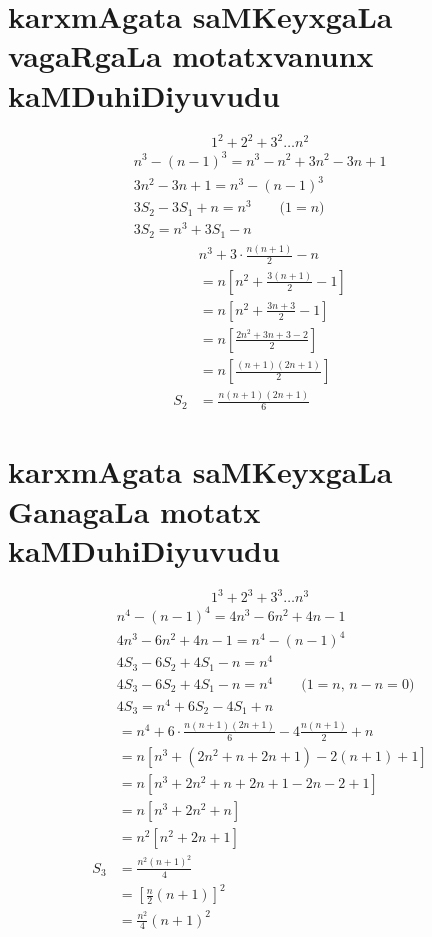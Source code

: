 \section*{\;karxmAgata saMKeyxgaLa vagaRgaLa motatxvanunx kaMDuhiDiyuvudu}
$$
1^2+2^2+3^2\ldots n^2
$$
\begin{gather*}
n^3 -(n-1)^3 = n^3 - n^2+3n^2 - 3n+1\\
3n^2-3n+1 = n^3-(n-1)^3\\
3S_{2}-3S_{1} +n = n^3 \qquad\text{($1=n$)}\\
3S_{2} = n^3+ 3S_{1}-n
\end{gather*}
\begin{align*}
&n^3 + 3 \cdot \frac{n(n+1)}{2} -n\\
&=n\left[n^2+\frac {3(n+1)}{2}-1\right]\\
&=n \left[n^2+\frac{3n+3}{2}-1\right]\\
&=n\left[\frac{2n^2 + 3n + 3 - 2}{2}\right]\\
&=n\left[\frac{(n+1)(2n+1)}{2}\right]\\
S_2 &=\frac{n(n+1)(2n+1)}{6}
\end{align*}

\section*{\;karxmAgata saMKeyxgaLa GanagaLa motatx kaMDuhiDiyuvudu}
$$
1^3+2^3+3^3\ldots n^3
$$
\begin{align*}
&n^4 - (n-1)^4 = 4n^3 - 6n^2 +4n -1\\
&4n^{3}-6n^2 + 4n -1 = n^4 - (n-1)^4\\
&4S_{3} - 6S_{2} +4S_{1} -n = n^4\\
&4S_{3}-6S_{2} +4S_{1}-n = n^4 \qquad\text{($1=n$, $n-n =0$)}\\
&4S_{3} = n^4 +6S_{2} -4S_{1} +n
\end{align*}
\begin{align*}
&=n^4+6\cdot \frac{n(n+1)(2n+1)}{6} -4 \frac{n(n+1)}{2}+n\\
&=n\left[n^3 + \left(2n^2 + n+2n +1\right) - 2(n+1) +1\right]\\
&=n\left[n^3+2n^2+n+2n+1-2n-2+1\right]\\
&=n\left[n^3+2n^{2}+n\right]\\
&=n^2\left[n^2+2n+1\right]\\
S_3&= \frac{n^2(n+1)^2}{4}\\
&=\left[\frac{n}{2}(n+1)\right]^2\\
&=\frac{n^2}{4}(n+1)^2
\end{align*}


